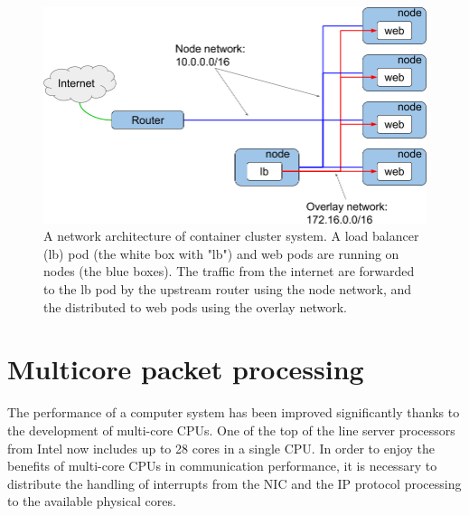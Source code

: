 \begin{figure}[h]
  \centering
  \includegraphics[width=1.0\columnwidth]{Figs/overlay.png}

  \par\bigskip
  \centering
  \begin{minipage}{0.9\columnwidth}
    \caption[A network architecture of container cluster system]{
      A network architecture of container cluster system.
      A load balancer (lb) pod (the white box with "lb") and web pods are running on nodes (the blue boxes).
      The traffic from the internet are forwarded to the lb pod by the upstream router using the node network,
      and the distributed to web pods using the overlay network.
    }
    \label{fig:overlay}
  \end{minipage}
  
\end{figure}

\FloatBarrier

\section{Multicore packet processing}


The performance of a computer system has been improved significantly thanks to the development of multi-core CPUs.
One of the top of the line server processors from Intel now includes up to 28 cores in a single CPU.
In order to enjoy the benefits of multi-core CPUs in communication performance,
it is necessary to distribute the handling of interrupts from the NIC and the IP protocol processing to the available physical cores.

